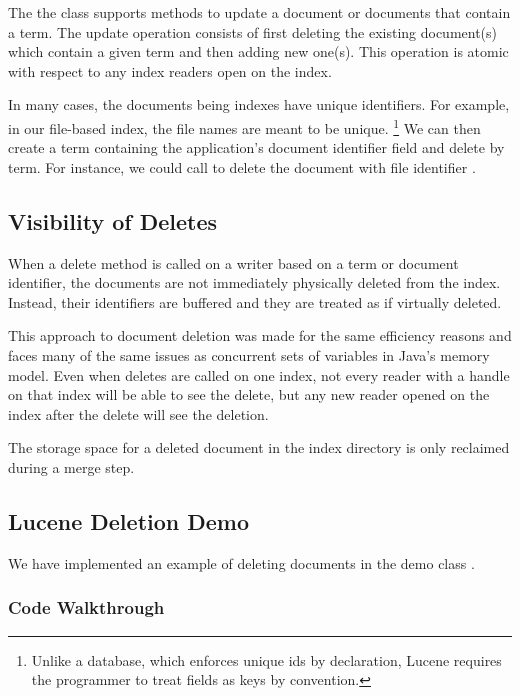 The the  class supports methods to update a document
or documents that contain a term.  The update operation consists of first
deleting the existing document(s) which contain a given term and then
adding new one(s).  This operation is atomic with respect to any index
readers open on the index.

In many cases, the documents being indexes have unique identifiers.
For example, in our file-based index, the file names are meant to be unique.%
%
\footnote{Unlike a database, which enforces unique ids by declaration,
Lucene requires the programmer to treat fields as keys by convention.}
%
We can then create a term containing the application's document
identifier field and delete by term.  For instance, we could call
 to delete the
document with file identifier .

\subsection{Visibility of Deletes}

When a delete method is called on a writer based on a term
or document identifier, the documents are not immediately physically
deleted from the index.  Instead, their identifiers are buffered and
they are treated as if virtually deleted.  

This approach to document deletion was made for the same efficiency
reasons and faces many of the same issues as concurrent sets of
variables in Java's memory model.  Even when deletes are called on one
index, not every reader with a handle on that index will be
able to see the delete, but any new reader opened on the index after the
delete will see the deletion.

The storage space for a deleted document in the index directory is
only reclaimed during a merge step.

\subsection{Lucene Deletion Demo}

We have implemented an example of deleting documents in the 
demo class .

\subsubsection{Code Walkthrough}

